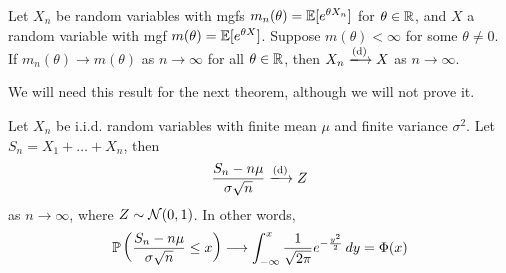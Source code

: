 \documentclass{../template/note}
\begin{document}
    \begin{proposition}
        Let \(X_n\) be random variables with mgfs \(m_n(\theta) = \mathbb E[e^{\theta X_n}]\) for \(\theta \in \mathbb R\), and \(X\) a random variable with mgf \(m(\theta) = \mathbb E[e^{\theta X}]\). Suppose \(m(\theta) < \infty\) for some \(\theta \neq 0\). If \(m_n(\theta) \to m(\theta)\) as \(n \to \infty\) for all \(\theta \in \mathbb R\), then \(X_n \dto X\) as \(n \to \infty\).
    \end{proposition}

    We will need this result for the next theorem, although we will not prove it.
    
    \begin{theorem}
        Let \(X_n\) be i.i.d. random variables with finite mean \(\mu\) and finite variance \(\sigma^2\). Let \(S_n = X_1 + \dots + X_n\), then
        \begin{align*}
            \frac{S_n-n\mu}{\sigma \sqrt n} \dto Z
        \end{align*}
        as \(n \to \infty\), where \(Z \sim \mathcal{N}(0, 1)\). In other words,
        \begin{align*}
            \mathbb P\left(\frac{S_n-n\mu}{\sigma \sqrt n} \leq x\right) \longrightarrow \int_{-\infty}^x \frac{1}{\sqrt{2\pi}} e^{-\frac{y^2}2} \,d{y} = \Phi(x)
        \end{align*}
    \end{theorem}
    
\end{document}
